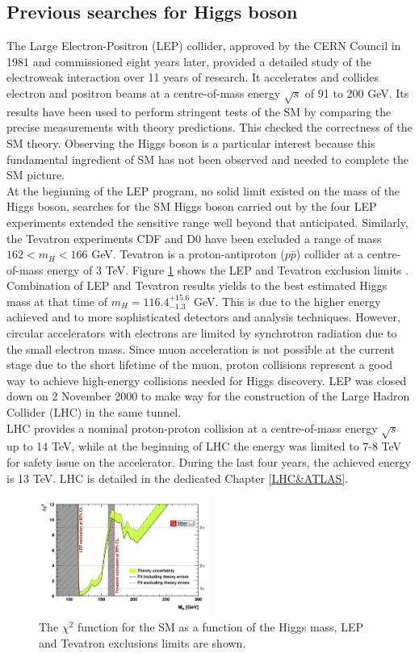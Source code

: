 \subsection{Previous searches for Higgs boson}

The Large Electron-Positron (LEP) collider, approved by the CERN Council in 1981 and commissioned eight years later, provided a detailed study of the electroweak interaction over 11 years of research. It accelerates and collides electron and positron beams at a centre-of-mass energy $\sqrt{s}$ of 91 to 200 GeV. Its results have been used to perform stringent tests of the SM by comparing the precise measurements with theory predictions. This checked the correctness of the SM theory. Observing the Higgs boson is a particular interest because this fundamental ingredient of SM has not been observed and needed to complete the SM picture. \\
At the beginning of the LEP program, no solid limit existed on the mass of the Higgs boson, searches for the SM Higgs boson carried out by the four LEP experiments extended the sensitive range well beyond that anticipated. Similarly, the Tevatron experiments CDF and D0 have been excluded a range of mass $162 < m_{H} < 166$ GeV. Tevatron is a proton-antiproton ($p\bar{p}$) collider at a centre-of-mass energy of 3 TeV. Figure \ref{fig:chap1:H2012:LEP} shows the LEP and Tevatron exclusion limits \cite{LEP, Tevatron, LEP_Tevatron}. Combination of LEP and Tevatron results yields to the best estimated Higgs mass at that time of $m_{H} = 116.4^{+15.6}_{-1.3}$ GeV. 
This is due to the higher energy achieved and to more sophisticated detectors and analysis techniques. However, circular accelerators with electrons are limited by synchrotron radiation due to the small electron mass. Since muon acceleration is not possible at the current stage due to the short lifetime of the muon, proton collisions represent a good way to achieve high-energy collisions needed for Higgs discovery. LEP was closed down on 2 November 2000 to make way for the construction of the Large Hadron Collider (LHC) in the same tunnel. \\
LHC provides a nominal proton-proton collision at a centre-of-mass energy $\sqrt{s}$ up to 14 TeV, while at the beginning of LHC the energy was limited to 7-8 TeV for safety issue on the accelerator. During the last four years, the achieved energy is 13 TeV. LHC is detailed in the dedicated Chapter \ref{LHC&ATLAS}. 
\begin{figure}[htbp]
    \centering
    \includegraphics[width=0.5\textwidth]{Ch1/Img/LEP_Tevatron_limits.png}
    \caption{The $\chi^2$ function for the SM as a function of the Higgs mass, LEP and Tevatron exclusions limits are shown.}
    \label{fig:chap1:H2012:LEP}
\end{figure}

